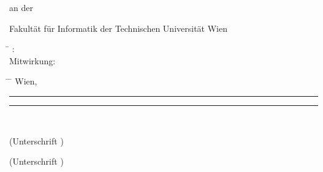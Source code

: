 \begin{center}
\begin{minipage}[t][1.7cm][t]{\textwidth}%
  \vspace{0pt}\raggedright\thesistitlefontnormalsize\sffamily
  an der

  Fakult\"{a}t f\"{u}r Informatik der Technischen Universit\"{a}t Wien
\end{minipage}

\begin{minipage}[t][3cm][t]{\textwidth}%
  \vspace{0pt}\raggedright\thesistitlefontnormalsize\sffamily
  \begin{tabbing}%
	    \hspace{19mm} \= \hspace{66mm} \kill
	    \tuinfthesisbetreuung: \> \tuinfthesisbetreins\\
	    Mitwirkung: \> \tuinfthesisbetrzwei
  \end{tabbing}
\end{minipage}

\begin{minipage}[t][2cm][t]{\textwidth}%
  \vspace{0pt}\sffamily\thesistitlefontnormalsize
  \begin{tabbing}%
    \hspace{42mm} \= \hspace{66mm} \= \hspace{51mm} \kill
    Wien, \tuinfthesisdate \> {\raggedright\rule{51mm}{0.5pt}} \> {\raggedright\rule{51mm}{0.5pt}} \\
    \> \begin{minipage}[t][0.5cm][t]{51mm}\centering (Unterschrift \tuinfthesisverfassung)\end{minipage}
    \> \begin{minipage}[t][0.5cm][t]{51mm}\centering (Unterschrift \tuinfthesisbetreuung)\end{minipage}
    \end{tabbing}
\end{minipage}

\end{center}

\cleardoublepage


\setlength{\baselineskip}{\tmpbaselineskip}
\setlength{\parindent}{\tmpparindent}

\restoregeometry


